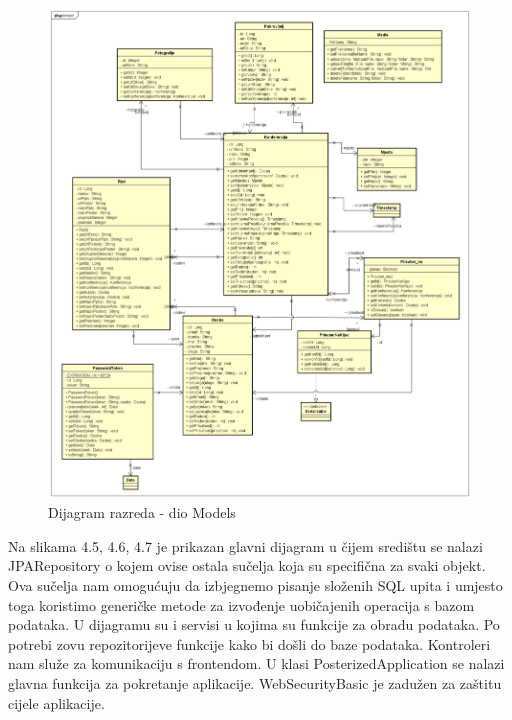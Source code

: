 			\begin{figure}[H]
				\includegraphics[scale=0.35]{dijagrami/models.png}%
				\centering
				\caption{Dijagram razreda - dio Models}
				\label{fig:promjena9}
			\end{figure}
			

			Na slikama 4.5, 4.6, 4.7 je prikazan glavni dijagram u čijem središtu se nalazi JPARepository o kojem ovise ostala sučelja koja su specifična za svaki objekt. Ova sučelja nam omogućuju da izbjegnemo pisanje složenih SQL upita i umjesto toga koristimo generičke metode za izvođenje uobičajenih operacija s bazom podataka.
U dijagramu su i servisi u kojima su funkcije za obradu podataka. Po potrebi zovu repozitorijeve funkcije kako bi došli do baze podataka.
Kontroleri nam služe za komunikaciju s frontendom. 
U klasi PosterizedApplication se nalazi glavna funkcija za pokretanje aplikacije. WebSecurityBasic je zadužen za zaštitu cijele aplikacije.

			

